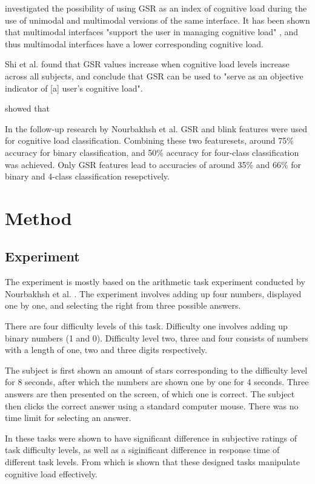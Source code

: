 \documentclass[12pt,leqno,letterpaper]{report} %
\begin{document}
\citep{Shi2007} investigated the possibility of using GSR as an index of cognitive load during the use of unimodal and multimodal versions of the same interface. It has been shown that multimodal interfaces "support the user in managing cognitive load" \citep{Oviatt2004}, and thus multimodal interfaces have a lower corresponding cognitive load. 

Shi et al. found that GSR values increase when cognitive load levels increase across all subjects, and conclude that GSR can be used to "serve as an objective indicator of [a] user's cognitive load".

\citep{Nourbakhsh2012} showed that 

In the follow-up research by Nourbakhsh et al. \citep{Nourbakhsh2013} GSR and blink features were used for cognitive load classification. Combining these two featuresets, around 75\% accuracy for binary classification, and 50\% accuracy for four-class classification was achieved. Only GSR features lead to accuracies of around 35\% and 66\% for binary and 4-class classification resepctively.



\chapter{Method}

\section{Experiment}
The experiment is mostly based on the arithmetic task experiment conducted by Nourbakhsh et al. \citep{Nourbakhsh2012}. The experiment involves adding up four numbers, displayed one by one, and selecting the right from three possible answers.

There are four difficulty levels of this task. Difficulty one involves adding up binary numbers (1 and 0). Difficulty level two, three and four consists of numbers with a length of one, two and three digits respectively.

The subject is first shown an amount of stars corresponding to the difficulty level for 8 seconds, after which the numbers are shown one by one for 4 seconds. Three answers are then presented on the screen, of which one is correct. The subject then clicks the correct answer using a standard computer mouse. There was no time limit for selecting an answer.

In \citep{Nourbakhsh2013} these tasks were shown to have significant difference in subjective ratings of task difficulty levels, as well as a siginificant difference in response time of different task levels. From which is shown that these designed tasks manipulate cognitive load effectively.
\end{document}
